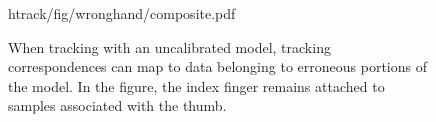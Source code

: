 \begin{figure}[t]
\centering
\begin{overpic} 
[width=\linewidth]
{htrack/fig/wronghand/composite.pdf}
\putfilename
\end{overpic}
\caption{
% 
When tracking with an uncalibrated model, tracking correspondences can map to data belonging to erroneous portions of the model. In the figure, the index finger remains attached to samples associated with the thumb. 
% 
}
\label{fig:wronghand}
\end{figure}
